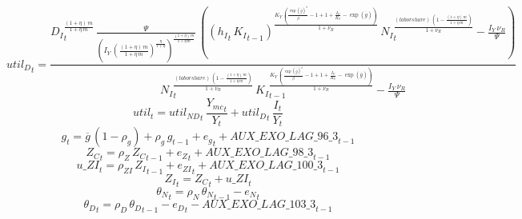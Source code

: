 \begin{dmath}
{{util_D}}_{t}=\frac{{{D_I}}_{t}^{\frac{\left(1+{{\eta}}\right)\, {{m}}}{1+{{\eta}}\, {{m}}}}\, \frac{{{\Psi}}}{\left({{I_Y}}\, \left(\frac{\left(1+{{\eta}}\right)\, {{m}}}{1+{{\eta}}\, {{m}}}\right)^{\frac{{{\eta}}}{1+{{\eta}}}}\right)^{\frac{\left(1+{{\eta}}\right)\, {{m}}}{1+{{\eta}}\, {{m}}}}}\, \left(\left({{h_I}}_{t}\, {{K_I}}_{t-1}\right)^{\frac{{{K_Y}}\, \left(\frac{\exp\left({{\overline{g}}}\right)^{{{\sigma}}}}{{{\beta}}}-1+1+\frac{{{I_Y}}}{{{K_Y}}}-\exp\left({{\overline{g}}}\right)\right)}{1+{{\nu_R}}}}\, {{N_I}}_{t}^{\frac{{(labor share)}\, \left(1-\frac{\left(1+{{\eta}}\right)\, {{m}}}{1+{{\eta}}\, {{m}}}\right)}{1+{{\nu_R}}}}-\frac{{{I_Y}}\, {{\nu_R}}}{{{\Psi}}}\right)}{{{N_I}}_{t}^{\frac{{(labor share)}\, \left(1-\frac{\left(1+{{\eta}}\right)\, {{m}}}{1+{{\eta}}\, {{m}}}\right)}{1+{{\nu_R}}}}\, {{K_I}}_{t-1}^{\frac{{{K_Y}}\, \left(\frac{\exp\left({{\overline{g}}}\right)^{{{\sigma}}}}{{{\beta}}}-1+1+\frac{{{I_Y}}}{{{K_Y}}}-\exp\left({{\overline{g}}}\right)\right)}{1+{{\nu_R}}}}-\frac{{{I_Y}}\, {{\nu_R}}}{{{\Psi}}}}
\end{dmath}
\begin{dmath}
{{util}}_{t}={{util_{ND}}}_{t}\, \frac{{{Y_{mc}}}_{t}}{{{Y}}_{t}}+{{util_D}}_{t}\, \frac{{{I}}_{t}}{{{Y}}_{t}}
\end{dmath}
\begin{dmath}
{{g}}_{t}={{\overline{g}}}\, \left(1-{{\rho_g}}\right)+{{\rho_g}}\, {{g}}_{t-1}+{{e_g}}_{t}+{AUX\_EXO\_LAG\_96\_3}_{t-1}
\end{dmath}
\begin{dmath}
{{Z_{C}}}_{t}={{\rho_Z}}\, {{Z_{C}}}_{t-1}+{{e_Z}}_{t}+{AUX\_EXO\_LAG\_98\_3}_{t-1}
\end{dmath}
\begin{dmath}
{u\_ZI}_{t}={{\rho_{ZI}}}\, {{Z_I}}_{t-1}+{{e_{ZI}}}_{t}+{AUX\_EXO\_LAG\_100\_3}_{t-1}
\end{dmath}
\begin{dmath}
{{Z_I}}_{t}={{Z_{C}}}_{t}+{u\_ZI}_{t}
\end{dmath}
\begin{dmath}
{{\theta_N}}_{t}={{\rho_N}}\, {{\theta_N}}_{t-1}-{{e_N}}_{t}
\end{dmath}
\begin{dmath}
{{\theta_D}}_{t}={{\rho_D}}\, {{\theta_D}}_{t-1}-{{e_D}}_{t}-{AUX\_EXO\_LAG\_103\_3}_{t-1}
\end{dmath}
